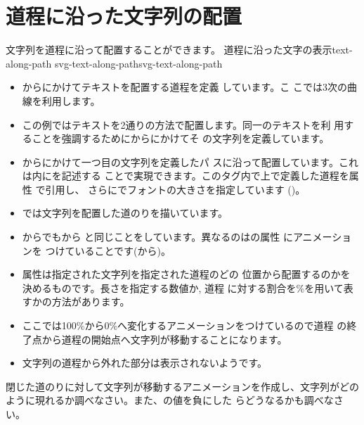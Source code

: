 \section{道程に沿った文字列の配置}
文字列を道程に沿って配置することができます。
    {道程に沿った文字の表示}{text-along-path}
		\newpage
{}
{svg-text-along-path}{svg-text-along-path}
\begin{itemize}
 \item {}からにかけてテキストを配置する道程を定義
       しています。こ
       こでは3次の\Bezier 曲線を利用します。
 \item この例ではテキストを2通りの方法で配置します。同一のテキストを利
       用することを強調するためにからにかけてそ
       の文字列を定義しています。
 \item {}からにかけて一つ目の文字列を定義したパ
       スに沿って配置しています。これは内にを記述する
       ことで実現できます。このタグ内で上で定義した道程を属性
       で引用し、
       さらにでフォントの大きさを指定しています
       ()。
 \item {}では文字列を配置した道のりを描いています。
 \item {}からでもから
       と同じことをしています。異なるのはの属性
       にアニメーションを
       つけていることです(から)。
 \item 属性は指定された文字列を指定された道程のどの
       位置から配置するのかを決めるものです。長さを指定する数値か, 道程
       に対する割合を\%を用いて表すかの方法があります。
 \item ここでは100\%から0\%へ変化するアニメーションをつけているので道程
       の終了点から道程の開始点へ文字列が移動することになります。
 \item 文字列の道程から外れた部分は表示されないようです。
\end{itemize}
\begin{Problem}
閉じた道のりに対して文字列が移動するアニメーションを作成し、文字列がどの
 ように現れるか調べなさい。また、の値を負にした
 らどうなるかも調べなさい。
\end{Problem}
